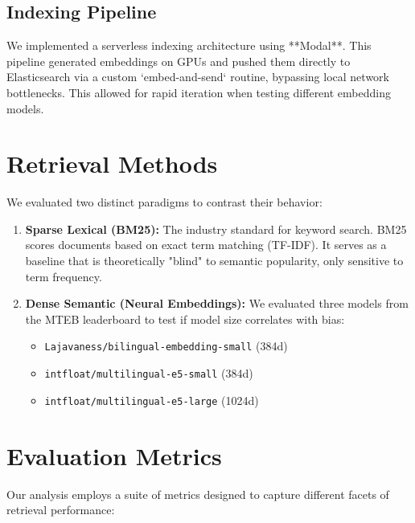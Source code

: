 \documentclass{article}
\begin{document}
\subsection{Indexing Pipeline}
We implemented a serverless indexing architecture using **Modal**. This pipeline generated embeddings on GPUs and pushed them directly to Elasticsearch via a custom `embed-and-send` routine, bypassing local network bottlenecks. This allowed for rapid iteration when testing different embedding models.

\section{Retrieval Methods}

We evaluated two distinct paradigms to contrast their behavior:

\begin{enumerate}[label=(\alph*)]
    \item \textbf{Sparse Lexical (BM25):} The industry standard for keyword search. BM25 scores documents based on exact term matching (TF-IDF). It serves as a baseline that is theoretically "blind" to semantic popularity, only sensitive to term frequency.
    
    \item \textbf{Dense Semantic (Neural Embeddings):} We evaluated three models from the MTEB leaderboard to test if model size correlates with bias:
    \begin{itemize}
        \item \texttt{Lajavaness/bilingual-embedding-small} (384d)
        \item \texttt{intfloat/multilingual-e5-small} (384d)
        \item \texttt{intfloat/multilingual-e5-large} (1024d)
    \end{itemize}
\end{enumerate}

\section{Evaluation Metrics}

Our analysis employs a suite of metrics designed to capture different facets of retrieval performance:
\end{document}
